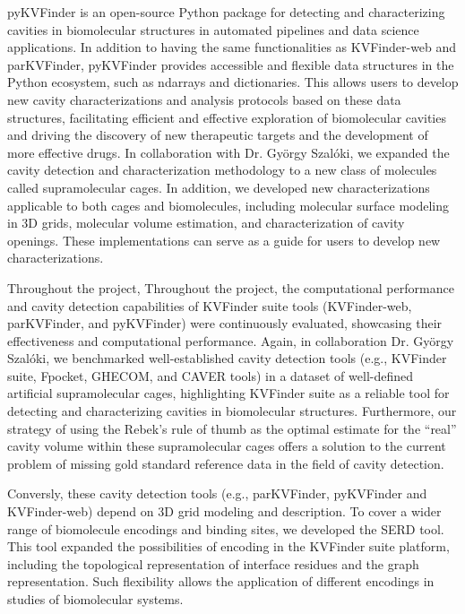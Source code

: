 \documentclass[Ingles]{phdthesis}
\def\eg{e.g.\onedot}
\begin{document}
pyKVFinder is an open-source Python package for detecting and characterizing cavities in biomolecular structures in automated pipelines and data science applications. In addition to having the same functionalities as KVFinder-web and parKVFinder, pyKVFinder provides accessible and flexible data structures in the Python ecosystem, such as \acs{ndarrays} and dictionaries. This allows users to develop new cavity characterizations and analysis protocols based on these data structures, facilitating efficient and effective exploration of biomolecular cavities and driving the discovery of new therapeutic targets and the development of more effective drugs. In collaboration with Dr. György Szalóki, we expanded the cavity detection and characterization methodology to a new class of molecules called supramolecular cages. In addition, we developed new characterizations applicable to both cages and biomolecules, including molecular surface modeling in \acs{3D} grids, molecular volume estimation, and characterization of cavity openings. These implementations can serve as a guide for users to develop new characterizations.

Throughout the project, Throughout the project, the computational performance and cavity detection capabilities of KVFinder suite tools (KVFinder-web, parKVFinder, and pyKVFinder) were continuously evaluated, showcasing their effectiveness and computational performance. Again, in collaboration Dr. György Szalóki, we benchmarked well-established cavity detection tools (\eg, KVFinder suite, Fpocket, GHECOM, and CAVER tools) in a dataset of well-defined artificial supramolecular cages, highlighting KVFinder suite as a reliable tool for detecting and characterizing cavities in biomolecular structures. Furthermore, our strategy of using the Rebek's rule of thumb as the optimal estimate for the “real” cavity volume within these supramolecular cages offers a solution to the current problem of missing gold standard reference data in the field of cavity detection.

Conversly, these cavity detection tools (\eg, parKVFinder, pyKVFinder and KVFinder-web) depend on \acs{3D} grid modeling and description. To cover a wider range of biomolecule encodings and binding sites, we developed the SERD tool. This tool expanded the possibilities of encoding in the KVFinder suite platform, including the topological representation of interface residues and the graph representation. Such flexibility allows the application of different encodings in studies of biomolecular systems.
\end{document}
